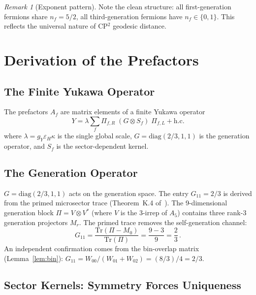 \documentclass[11pt,a4paper]{article}
\newcommand{\Tr}{\mathrm{Tr}}
\theoremstyle{remark}
\newtheorem{remark}[theorem]{Remark}
\begin{document}
\begin{remark}[Exponent pattern]
Note the clean structure: all first-generation fermions share $n_f = 5/2$,
all third-generation fermions have $n_f \in \{0, 1\}$.  This reflects
the universal nature of CP$^2$ geodesic distance.
\end{remark}


\section{Derivation of the Prefactors}
\label{sec:prefactors}

\subsection{The Finite Yukawa Operator}

The prefactors $A_f$ are matrix elements of a finite Yukawa operator
\begin{equation}
Y = \lambda \sum_f \Pi_{f,R}\;(G \otimes S_f)\;\Pi_{f,L} + \text{h.c.}
\label{eq:yukawa-op}
\end{equation}
where $\lambda = g_Y \varepsilon_H \kappa$ is the single global scale,
$G = \mathrm{diag}(2/3, 1, 1)$ is the generation operator, and $S_f$ is the
sector-dependent kernel.

\subsection{The Generation Operator}

$G = \mathrm{diag}(2/3, 1, 1)$ acts on the generation space.
The entry $G_{11} = 2/3$ is derived from the primed microsector trace
(Theorem~K.4 of~\cite{DFDUnified}).  The 9-dimensional generation block
$\Pi = V\otimes V^*$ (where $V$ is the 3-irrep of $A_5$) contains three
rank-3 generation projectors $M_r$.  The primed trace removes the
self-generation channel:
\begin{equation}
G_{11} = \frac{\Tr(\Pi - M_0)}{\Tr(\Pi)} = \frac{9-3}{9} = \frac{2}{3}\,.
\end{equation}
An independent confirmation comes from the bin-overlap matrix (Lemma~\ref{lem:bin}):
$G_{11} = W_{00}/(W_{01}+W_{02}) = (8/3)/4 = 2/3$.

\subsection{Sector Kernels: Symmetry Forces Uniqueness}
\end{document}
